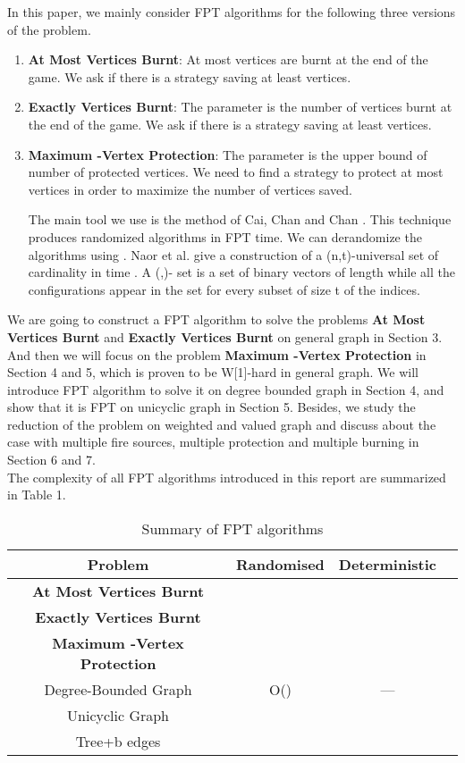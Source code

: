 \documentclass[11pt,letter]{article}
\begin{document}
In this paper, we mainly consider FPT algorithms for the following three versions of the  problem. 
\begin{enumerate}
\item \textbf{At Most  Vertices Burnt}: At most  vertices are burnt at the end of the game. We ask if there is a strategy saving at least  vertices.

\item \textbf{Exactly  Vertices Burnt}: The parameter  is the number of vertices burnt at the end of the game. We ask if there is a strategy saving at least  vertices.

\item \textbf{Maximum -Vertex Protection}: The parameter  is the upper bound of number of protected vertices. We need to find a strategy to protect at most  vertices in order to maximize the number of vertices saved.

The main tool we use is the  method of Cai, Chan and Chan \cite{CCC06}. This technique produces randomized algorithms in FPT time. We can derandomize the algorithms using  \cite{NSS95}. Naor et al. give a construction of a (n,t)-universal set of cardinality  in time . A (,)- set is a set of binary vectors of length  while all the  configurations appear in the set for every subset of size t of the indices.\\

\end{enumerate}
We are going to construct a FPT algorithm to solve the problems \textbf{At Most  Vertices Burnt} and \textbf{Exactly  Vertices Burnt} on general graph in Section 3. And then we will focus on the problem \textbf{Maximum -Vertex Protection} in Section 4 and 5, which is proven to be W[1]-hard in general graph. We will introduce FPT algorithm to solve it on degree bounded graph in Section 4, and show that it is FPT on unicyclic graph in Section 5. Besides, we study the reduction of the problem on weighted and valued graph and discuss about the case with multiple fire sources, multiple protection and multiple burning in Section 6 and 7.\\

The complexity of all FPT algorithms introduced in this report are summarized in Table 1.\\

\begin{table}[ht]
\caption{Summary of FPT algorithms} \centering \begin{tabular}{c c c c} \hline\hline Problem & Randomised & Deterministic  &  \\ [0.5ex] \hline \textbf{At Most  Vertices Burnt} &   &  \\ \textbf{Exactly  Vertices Burnt} &   &  \\
\textbf{Maximum -Vertex Protection} \\
Degree-Bounded Graph & O() & --- \\
Unicyclic Graph &  &  \\
Tree+b edges&  &  \\
\hline \end{tabular}
\label{table:nonlin} \end{table}
\end{document}
